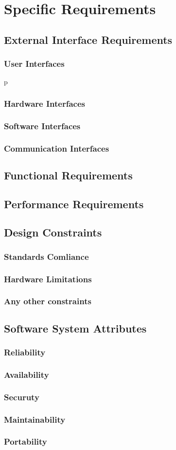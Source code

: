 \chapter{Specific Requirements}

\section{External Interface Requirements}
\subsection{User Interfaces}
p
\subsection{Hardware Interfaces}
\subsection{Software Interfaces}
\subsection{Communication Interfaces}

\section{Functional Requirements}
\section{Performance Requirements}

\section{Design Constraints}
\subsection{Standards Comliance}
\subsection{Hardware Limitations}
\subsection{Any other constraints}

\section{Software System Attributes}
\subsection{Reliability}
\subsection{Availability}
\subsection{Securuty}
\subsection{Maintainability}
\subsection{Portability}
